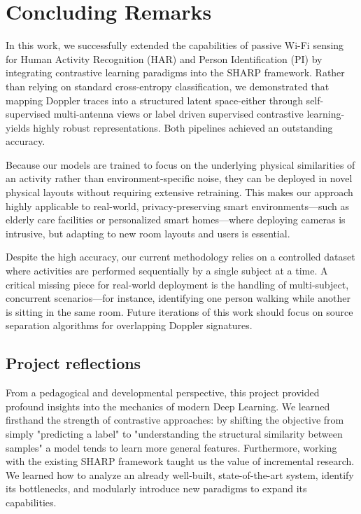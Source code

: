 
\section{Concluding Remarks}
\label{sec:conclusions}

In this work, we successfully extended the capabilities of passive Wi-Fi sensing for Human Activity Recognition (HAR) and Person Identification (PI) by integrating contrastive learning paradigms into the SHARP framework. Rather than relying on standard cross-entropy classification, we demonstrated that mapping Doppler traces into a structured latent space-either through self-supervised multi-antenna views or label driven supervised contrastive learning-yields highly robust representations. Both pipelines achieved an outstanding accuracy.

Because our models are trained to focus on the underlying physical similarities of an activity rather than environment-specific noise, they can be deployed in novel physical layouts without requiring extensive retraining. This makes our approach highly applicable to real-world, privacy-preserving smart environments—such as elderly care facilities or personalized smart homes—where deploying cameras is intrusive, but adapting to new room layouts and users is essential.

Despite the high accuracy, our current methodology relies on a controlled dataset where activities are performed sequentially by a single subject at a time. A critical missing piece for real-world deployment is the handling of multi-subject, concurrent scenarios—for instance, identifying one person walking while another is sitting in the same room. Future iterations of this work should focus on source separation algorithms for overlapping Doppler signatures.

\subsection{Project reflections}
From a pedagogical and developmental perspective, this project provided profound insights into the mechanics of modern Deep Learning. We learned firsthand the strength of contrastive approaches: by shifting the objective from simply "predicting a label" to "understanding the structural similarity between samples" a model tends to learn more general features. Furthermore, working with the existing SHARP framework taught us the value of incremental research. We learned how to analyze an already well-built, state-of-the-art system, identify its bottlenecks, and modularly introduce new paradigms to expand its capabilities.

